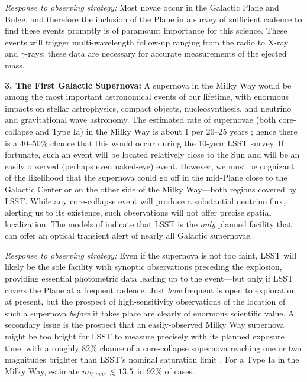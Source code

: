 {\it Response to observing strategy:} Most novae occur in the Galactic
Plane and Bulge, and therefore the inclusion of the Plane in a survey
of sufficient cadence to find these events promptly is of paramount
importance for this science. These events will trigger
multi-wavelength follow-up ranging from the radio to X-ray and
$\gamma$-rays; these data are necessary for accurate measurements of
the ejected mass.

{\bf 3. The First Galactic Supernova:} A supernova in the Milky Way
would be among the most important astronomical events of our lifetime,
with enormous impacts on stellar astrophysics, compact objects,
nucleosynthesis, and neutrino and gravitational wave astronomy. The
estimated rate of supernovae (both core-collapse and Type Ia) in the
Milky Way is about 1 per 20--25 years \citep{2013ApJ...778..164A}; hence there
is a 40--50\% chance that this would occur during the 10-year LSST
survey. If fortunate, such an event will be located relatively close
to the Sun and will be an easily observed (perhaps even naked-eye)
event. However, we must be cognizant of the likelihood that the
supernova could go off in the mid-Plane close to the Galactic Center
or on the other side of the Milky Way---both regions covered by
LSST. While any core-collapse event will produce a substantial
neutrino flux, alerting us to its existence, such observations will
not offer precise spatial localization. The models of \citet{2013ApJ...778..164A}
indicate that LSST is the \emph{only} planned facility that
can offer an optical transient alert of nearly all Galactic
supernovae.

{\it Response to observing strategy:} Even if the supernova is not too
faint, LSST will likely be the sole facility with synoptic
observations preceding the explosion, providing essential photometric
data leading up to the event---but only if LSST covers the Plane at a
frequent cadence. Just {\it how} frequent is open to exploration at
present, but the prospect of high-sensitivity observations of the
location of such a supernova {\it before} it takes place are clearly
of enormous scientific value. A secondary issue is the prospect that
an easily-observed Milky Way supernova might be too bright for LSST to
measure precisely with its planned exposure time, with a roughly 82\%
chance of a core-collapse supernova reaching one or two magnitudes
brighter than LSST's nominal saturation limit \citep[with a 1/3 chance that
a ccSN would reach $m_V \sim 5$;][]{2013ApJ...778..164A}. For a Type Ia in
the Milky Way,
\citet{2013ApJ...778..164A} estimate $m_{V, max} \lesssim 13.5$~in 92\% of
cases.

